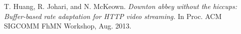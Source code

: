 \documentclass[9pt,a4paper]{acmproc}
\begin{document}
\begin{thebibliography}{9}
T. Huang, R. Johari, and N. McKeown.
	\emph{ Downton abbey without the hiccups: Buffer-based rate adaptation for HTTP video streaming.}
	\newline
	 In Proc. ACM SIGCOMM FhMN
Workshop, Aug. 2013.





\end{thebibliography}

\thispagestyle{empty}
\end{document}

